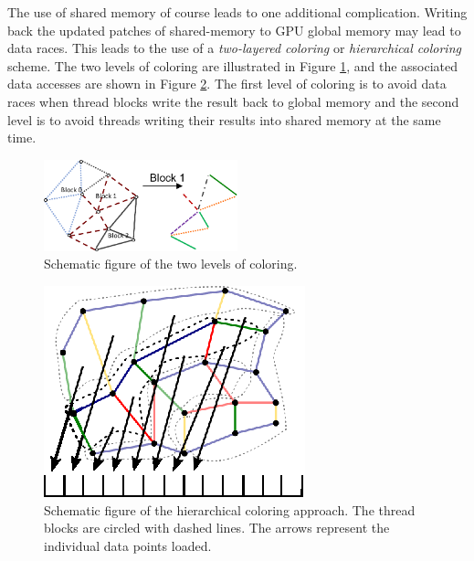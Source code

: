 The use of shared memory of course leads to one additional complication. 
Writing back the updated patches of shared-memory to GPU global memory may lead 
to data races. This leads to the use of a \emph{two-layered coloring} or 
\emph{hierarchical coloring}~\cite{op2} scheme. The two levels of coloring are illustrated in Figure \ref{fig:multilevel}, and the associated data accesses are shown in Figure \ref{fig:unstructured_hier}. The 
first level of coloring is to avoid data races when thread blocks write the result back to 
global memory and the second level is to avoid threads writing their results into 
shared memory at the same time. 

\begin{figure}[Htpb]
  \centering
  \includegraphics[width=0.5\textwidth]{fig/multilevel.pdf}
  \caption{Schematic figure of the two levels of coloring.}
  \label{fig:multilevel}
\end{figure}

\begin{figure}[Htpb]
  \centering
  \includegraphics{fig/svg/unstructured_hier.eps}
  \caption{Schematic figure of the hierarchical coloring approach. The thread
  blocks are circled with dashed lines. The arrows represent the individual data
  points loaded.}
  \label{fig:unstructured_hier}
\end{figure}

